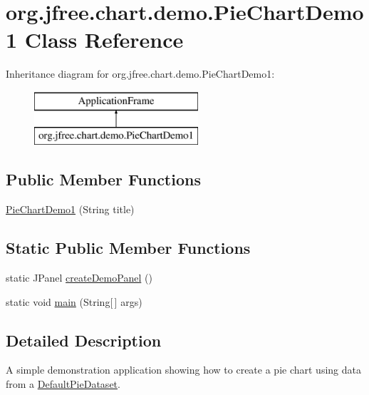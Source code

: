 \hypertarget{classorg_1_1jfree_1_1chart_1_1demo_1_1_pie_chart_demo1}{}\section{org.\+jfree.\+chart.\+demo.\+Pie\+Chart\+Demo1 Class Reference}
\label{classorg_1_1jfree_1_1chart_1_1demo_1_1_pie_chart_demo1}
Inheritance diagram for org.\+jfree.\+chart.\+demo.\+Pie\+Chart\+Demo1\+:\begin{figure}[H]
\begin{center}
\leavevmode
\includegraphics[height=2.000000cm]{classorg_1_1jfree_1_1chart_1_1demo_1_1_pie_chart_demo1}
\end{center}
\end{figure}
\subsection*{Public Member Functions}
\begin{DoxyCompactItemize}
\item 
\mbox{\hyperlink{classorg_1_1jfree_1_1chart_1_1demo_1_1_pie_chart_demo1_abbdd7ce61c04d3f5c05330aa93eae4c3}{Pie\+Chart\+Demo1}} (String title)
\end{DoxyCompactItemize}
\subsection*{Static Public Member Functions}
\begin{DoxyCompactItemize}
\item 
static J\+Panel \mbox{\hyperlink{classorg_1_1jfree_1_1chart_1_1demo_1_1_pie_chart_demo1_afe8c6912d2fcb57804df4a090acbd51b}{create\+Demo\+Panel}} ()
\item 
static void \mbox{\hyperlink{classorg_1_1jfree_1_1chart_1_1demo_1_1_pie_chart_demo1_aa3e31ac830dd8f13202b78f5dfb647e6}{main}} (String\mbox{[}$\,$\mbox{]} args)
\end{DoxyCompactItemize}


\subsection{Detailed Description}
A simple demonstration application showing how to create a pie chart using data from a \mbox{\hyperlink{}{Default\+Pie\+Dataset}}. 

